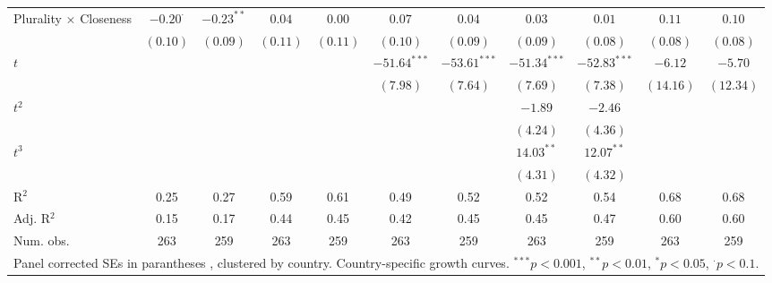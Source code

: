 \begin{sidewaystable}
\begin{center}
\begin{tabular}{l c c c c c c c c c c }
Plurality $\times$ Closeness   & $-0.20^{\cdot}$ & $-0.23^{**}$    & $0.04$       & $0.00$        & $0.07$         & $0.04$         & $0.03$         & $0.01$         & $0.11$          & $0.10$          \\
                               & $(0.10)$        & $(0.09)$        & $(0.11)$     & $(0.11)$      & $(0.10)$       & $(0.09)$       & $(0.09)$       & $(0.08)$       & $(0.08)$        & $(0.08)$        \\
$t$                            &                 &                 &              &               & $-51.64^{***}$ & $-53.61^{***}$ & $-51.34^{***}$ & $-52.83^{***}$ & $-6.12$         & $-5.70$         \\
                               &                 &                 &              &               & $(7.98)$       & $(7.64)$       & $(7.69)$       & $(7.38)$       & $(14.16)$       & $(12.34)$       \\
$t^2$                          &                 &                 &              &               &                &                & $-1.89$        & $-2.46$        &                 &                 \\
                               &                 &                 &              &               &                &                & $(4.24)$       & $(4.36)$       &                 &                 \\
$t^3$                          &                 &                 &              &               &                &                & $14.03^{**}$   & $12.07^{**}$   &                 &                 \\
                               &                 &                 &              &               &                &                & $(4.31)$       & $(4.32)$       &                 &                 \\
\midrule
R$^2$                          & 0.25            & 0.27            & 0.59         & 0.61          & 0.49           & 0.52           & 0.52           & 0.54           & 0.68            & 0.68            \\
Adj. R$^2$                     & 0.15            & 0.17            & 0.44         & 0.45          & 0.42           & 0.45           & 0.45           & 0.47           & 0.60            & 0.60            \\
Num. obs.                      & 263             & 259             & 263          & 259           & 263            & 259            & 263            & 259            & 263             & 259             \\
\bottomrule
\multicolumn{11}{l}{\scriptsize{Panel corrected SEs in parantheses \cite{Beck.1995}, clustered by country. Country-specific growth curves. $^{***}p<0.001$, $^{**}p<0.01$, $^*p<0.05$, $^{\cdot}p<0.1$.}}
\end{tabular}
\end{center}
\end{sidewaystable}
